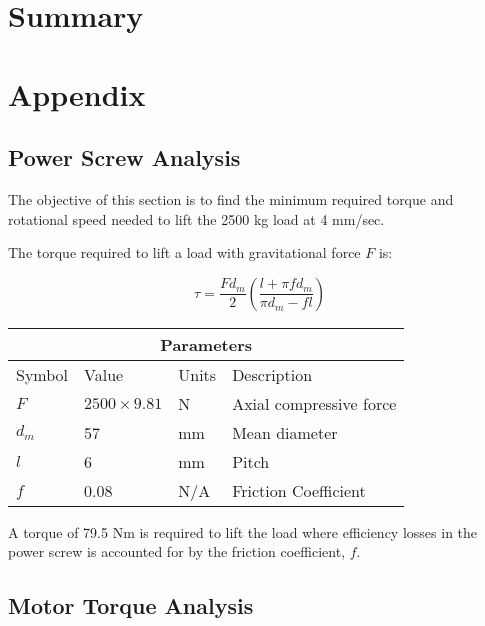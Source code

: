 \documentclass[letterpaper,12pt]{article}
\begin{document}
	\section{Summary}
	
	\newpage
	
	\section{Appendix}
	
	\subsection{Power Screw Analysis}
	
	The objective of this section is to find the minimum required torque and rotational speed needed to lift the 2500 kg load at 4 mm/sec.
	
	The torque required to lift a load with gravitational force $F$ is:
	
	\begin{equation}
	\tau = \frac{Fd_m}{2}\left(\frac{l+\pi f d_m}{\pi d_m - fl}\right)
	\end{equation}
	
	\begin{center}
		\begin{tabular}{ |p{2cm}||p{3cm}|p{2cm}|p{7cm}|  }
			\hline
			\multicolumn{4}{|c|}{Parameters} \\
			\hline
			Symbol& Value & Units & Description\\
			\hline
			$F$ & $2500 \times 9.81$ & N & Axial compressive force\\
			$d_m$ & 57 & mm   & Mean diameter\\
			$l$ & 6 & mm &  Pitch\\
			$f$ & 0.08 & N/A & Friction Coefficient\\
			\hline
		\end{tabular}
	\end{center}
	
A torque of 79.5 Nm is required to lift the load where efficiency losses in the power screw is accounted for by the friction coefficient, $f$. 

\subsection{Motor Torque Analysis}

\end{document}
